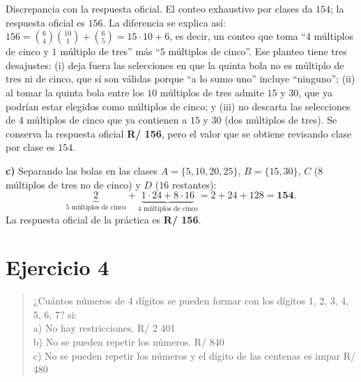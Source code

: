 \documentclass[11pt]{article}
\begin{document}
\begin{nota}
Discrepancia con la respuesta oficial. El conteo exhaustivo por clases da $154$; la respuesta oficial es $156$. La diferencia se explica así: $156 = \binom{6}{4}\binom{10}{1} + \binom{6}{5} = 15\cdot 10 + 6$, es decir, un conteo que toma ``$4$ múltiplos de cinco y $1$ múltiplo de tres'' más ``$5$ múltiplos de cinco''. Ese planteo tiene tres desajustes: (i) deja fuera las selecciones en que la quinta bola no es múltiplo de tres ni de cinco, que sí son válidas porque ``a lo sumo uno'' incluye ``ninguno''; (ii) al tomar la quinta bola entre los $10$ múltiplos de tres admite $15$ y $30$, que ya podrían estar elegidos como múltiplos de cinco; y (iii) no descarta las selecciones de $4$ múltiplos de cinco que ya contienen a $15$ y $30$ (dos múltiplos de tres). Se conserva la respuesta oficial \textbf{R/ 156}, pero el valor que se obtiene revisando clase por clase es $154$.
\end{nota}

\begin{resp}
\textbf{c)} Separando las bolas en las clases $A=\{5,10,20,25\}$, $B=\{15,30\}$, $C$ ($8$ múltiplos de tres no de cinco) y $D$ ($16$ restantes):
\[
\underbrace{2}_{\text{5 múltiplos de cinco}}+\underbrace{1\cdot 24 + 8\cdot 16}_{\text{4 múltiplos de cinco}} = 2+24+128 = \mathbf{154} .
\]
La respuesta oficial de la práctica es \textbf{R/ 156}.
\end{resp}

\section*{Ejercicio 4}

\begin{quote}
¿Cuántos números de 4 dígitos se pueden formar con los dígitos 1, 2, 3, 4, 5, 6, 7? si:\\
a) No hay restricciones. \hfill R/ 2 401\\
b) No se pueden repetir los números. \hfill R/ 840\\
c) No se pueden repetir los números y el dígito de las centenas es impar \hfill R/ 480
\end{quote}
\end{document}

